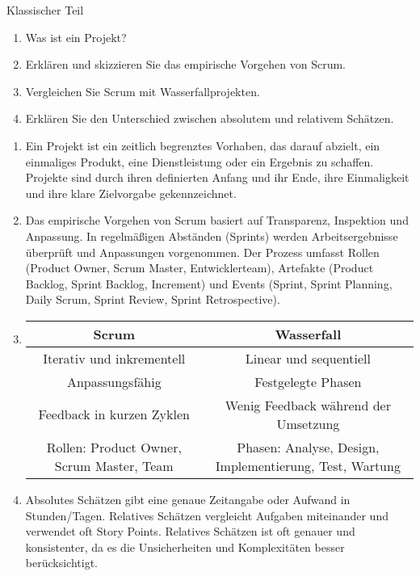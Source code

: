 \documentclass{article}
\begin{document}
\begin{exercise}{Klassischer Teil}
  \begin{enumerate}
    \item Was ist ein Projekt?
    \item Erklären und skizzieren Sie das empirische Vorgehen von Scrum.
    \item Vergleichen Sie Scrum mit Wasserfallprojekten.
    \item Erklären Sie den Unterschied zwischen absolutem und relativem Schätzen.
  \end{enumerate}

  \begin{solution}
    \begin{enumerate}
      \item Ein Projekt ist ein zeitlich begrenztes Vorhaben, das darauf abzielt, ein einmaliges Produkt, eine Dienstleistung oder ein Ergebnis zu schaffen. Projekte sind durch ihren definierten Anfang und ihr Ende, ihre Einmaligkeit und ihre klare Zielvorgabe gekennzeichnet.
      \item Das empirische Vorgehen von Scrum basiert auf Transparenz, Inspektion und Anpassung. In regelmäßigen Abständen (Sprints) werden Arbeitsergebnisse überprüft und Anpassungen vorgenommen. Der Prozess umfasst Rollen (Product Owner, Scrum Master, Entwicklerteam), Artefakte (Product Backlog, Sprint Backlog, Increment) und Events (Sprint, Sprint Planning, Daily Scrum, Sprint Review, Sprint Retrospective).
      \item
            \begin{tabular}{|c|c|}
              \hline
              \textbf{Scrum}                            & \textbf{Wasserfall}                                     \\
              \hline
              Iterativ und inkrementell                 & Linear und sequentiell                                  \\
              Anpassungsfähig                           & Festgelegte Phasen                                      \\
              Feedback in kurzen Zyklen                 & Wenig Feedback während der Umsetzung                    \\
              Rollen: Product Owner, Scrum Master, Team & Phasen: Analyse, Design, Implementierung, Test, Wartung \\
              \hline
            \end{tabular}
      \item Absolutes Schätzen gibt eine genaue Zeitangabe oder Aufwand in Stunden/Tagen. Relatives Schätzen vergleicht Aufgaben miteinander und verwendet oft Story Points. Relatives Schätzen ist oft genauer und konsistenter, da es die Unsicherheiten und Komplexitäten besser berücksichtigt.
    \end{enumerate}
  \end{solution}
\end{exercise}
\end{document}
